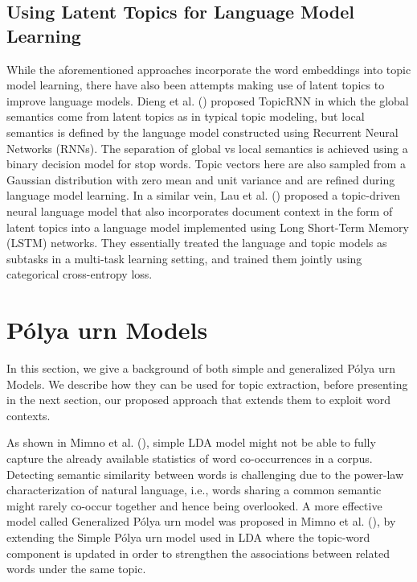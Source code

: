 \documentclass[letterpaper]{article}
\begin{document}
\subsection{Using Latent Topics for Language Model Learning}

While the aforementioned approaches incorporate the word embeddings into topic model learning, there have also been attempts making use of latent topics to improve language models. Dieng et al. (\citeyear{dieng2017topicrnn}) proposed TopicRNN in which the global semantics come from latent topics as in typical topic modeling, but local semantics is defined by the language model constructed using Recurrent Neural Networks (RNNs). The separation of global vs local semantics is achieved using a binary decision model for stop words. Topic vectors here are also sampled from a Gaussian distribution with zero mean and unit variance and are refined during language model learning. In a similar vein, Lau et al. (\citeyear{lau2017topically}) proposed a topic-driven neural language model that also incorporates document context in the form of latent topics into a language model implemented using Long Short-Term Memory (LSTM) networks. They essentially treated the language and topic models as subtasks in a multi-task learning setting, and trained them jointly using categorical cross-entropy loss.









\section{P\'{o}lya urn Models}
In this section, we give a background of both simple and generalized P\'{o}lya urn Models. We describe how they can be used for topic extraction, before presenting in the next section, our proposed approach that extends them to exploit word contexts.

As shown in Mimno et al. (\citeyear{Mimno11}), simple LDA model might not be able to fully capture the already available statistics of word co-occurrences in a corpus. Detecting semantic similarity between words is challenging due to the power-law characterization of natural language, i.e., words sharing a common semantic might rarely co-occur together and hence being overlooked. %
A more effective model called Generalized P\'{o}lya urn model was proposed in Mimno et al. (\citeyear{Mimno11}), by extending the Simple P\'{o}lya urn model used in LDA where the topic-word component is updated in order to strengthen the associations between related words under the same topic.
\end{document}
